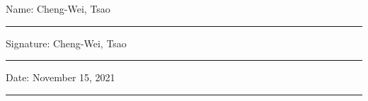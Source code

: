 \documentclass[11pt,oneside]{book}
\begin{document}
\noindent Name: Cheng-Wei, Tsao\\[1mm]
\rule[1em]{25em}{0.5pt}

\noindent Signature: Cheng-Wei, Tsao\\[1mm]
\rule[1em]{25em}{0.5pt}

\noindent Date: November 15, 2021\\[1mm]
\rule[1em]{25em}{0.5pt}





\tableofcontents
\listoffigures
\listoftables


\mainmatter







 
 

\begin{appendices}


\end{appendices}
\end{document}
